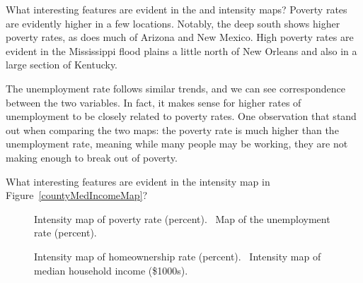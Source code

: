 \begin{examplewrap}
\begin{nexample}{What interesting features are evident in the
     and 
    intensity maps?}
  Poverty rates are evidently higher in a few locations.
  Notably, the deep south shows higher poverty rates,
  as does much of Arizona and New Mexico.
  High poverty rates are evident in the Mississippi
  flood plains a little north of New Orleans and
  also in a large section of Kentucky.

  The unemployment rate follows similar trends,
  and we can see correspondence between the two
  variables. In fact, it makes sense for higher rates
  of unemployment to be closely related to poverty rates.
  One observation that stand out when comparing the two maps:
  the poverty rate is much higher than the unemployment
  rate, meaning while many people may be working,
  they are not making enough to break out of poverty.
\end{nexample}
\end{examplewrap}

\begin{exercisewrap}
\begin{nexercise}
What interesting features are evident in the
 intensity map in
Figure~\ref{countyMedIncomeMap}?\footnotemark{}
\end{nexercise}
\end{exercisewrap}

\begin{figure}
  \centering
  \caption{ Intensity map of
      poverty rate (percent).
      ~Map of the
      unemployment rate (percent).}
  \label{countyIntensityMaps1}
\end{figure}

\begin{figure}
  \centering
  \caption{ Intensity map
      of homeownership rate (percent).
      ~Intensity map of median
      household income (\$1000s).}
\label{countyIntensityMaps2}
\end{figure}

